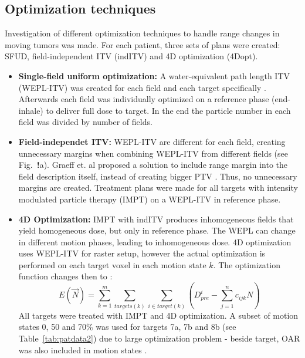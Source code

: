 \documentclass[type=dr, dr=rernat, accentcolor=tud7b,colorbacktitle, bigchapter, openright, twoside, 12pt ]{tudthesis}
\begin{document}
\subsection{Optimization techniques}

Investigation of different optimization techniques to handle range changes in moving tumors was made. For each patient, three sets of plans were created: SFUD, field-independent ITV (indITV) and 4D optimization (4Dopt). 

\begin{itemize}
\item \textbf{Single-field uniform optimization:} A water-equivalent path length ITV (WEPL-ITV) was created for each field and each target specifically \cite{Rietzel2012}. Afterwards each field was individually optimized on a reference phase (end-inhale) to deliver full dose to target. In the end the particle number in each field was divided by number of fields.

\item \textbf{Field-independet ITV:} WEPL-ITV are different for each field, creating unnecessary margins when combining WEPL-ITV from different fields (see Fig.~\textbf{!}a). Graeff et. al proposed a solution to include range margin into the field description itself, instead of creating bigger PTV \cite{Graeff2012}. Thus, no unnecessary margins are created. Treatment plans were made for all targets with intensity modulated particle therapy (IMPT) on a WEPL-ITV in reference phase.

\item \textbf{4D Optimization:} IMPT with indITV produces inhomogeneous fields that yield homogeneous dose, but only in reference phase. The WEPL can change in different motion phases, leading to inhomogeneous dose.
4D optimization uses WEPL-ITV for raster setup, however the actual optimization is performed on each target voxel in each motion state $k$. The optimization function changes then to \cite{Graeff2012}:
\begin{equation}
\label{eq-multiCost}
E(\vec{N}) = \sum_{k=1}^{m}\sum_{targets(k)} \sum_{i\in target(k)} \left( D_{pre}^{i} -\sum_{j=1}^n c_{ijk}N\right)
\end{equation}
All targets were treated with IMPT and 4D optimization. A subset of motion states 0, 50 and 70\% was used for targets 7a, 7b and 8b (see Table~\ref{tab:patdata2}) due to large optimization problem - beside target, OAR was also included
in motion states \cite{Graeff2012}.


\end{itemize}
\end{document}
